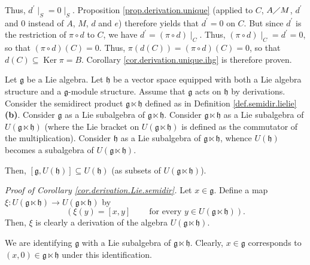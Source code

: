 \documentclass[etingof-lie.tex]{subfiles}
\begin{document}
Thus, $d^{\prime}\mid_{S}=0\mid_{S}$. Proposition \ref{prop.derivation.unique}
(applied to $C$, $A\diagup M$, $d^{\prime}$ and $0$ instead of $A$, $M$, $d$
and $e$) therefore yields that $d^{\prime}=0$ on $C$. But since $d^{\prime}$
is the restriction of $\pi\circ d$ to $C$, we have $d^{\prime}=\left(
\pi\circ d\right)  \mid_{C}$. Thus, $\left(  \pi\circ d\right)  \mid
_{C}=d^{\prime}=0$, so that $\left(  \pi\circ d\right)  \left(  C\right)  =0$.
Thus, $\pi\left(  d\left(  C\right)  \right)  =\left(  \pi\circ d\right)
\left(  C\right)  =0$, so that $d\left(  C\right)  \subseteq
\operatorname*{Ker}\pi=B$. Corollary \ref{cor.derivation.unique.ihg} is
therefore proven.

\begin{corollary}
\label{cor.derivation.Lie.semidir}Let $\mathfrak{g}$ be a Lie algebra. Let
$\mathfrak{h}$ be a vector space equipped with both a Lie algebra structure
and a $\mathfrak{g}$-module structure. Assume that $\mathfrak{g}$ acts on
$\mathfrak{h}$ by derivations. Consider the semidirect product $\mathfrak{g}%
\ltimes\mathfrak{h}$ defined as in Definition \ref{def.semidir.lielie}
\textbf{(b)}. Consider $\mathfrak{g}$ as a Lie subalgebra of $\mathfrak{g}%
\ltimes\mathfrak{h}$. Consider $\mathfrak{g}\ltimes\mathfrak{h}$ as a Lie
subalgebra of $U\left(  \mathfrak{g}\ltimes\mathfrak{h}\right)  $ (where the
Lie bracket on $U\left(  \mathfrak{g}\ltimes\mathfrak{h}\right)  $ is defined
as the commutator of the multiplication). Consider $\mathfrak{h}$ as a Lie
subalgebra of $\mathfrak{g}\ltimes\mathfrak{h}$, whence $U\left(
\mathfrak{h}\right)  $ becomes a subalgebra of $U\left(  \mathfrak{g}%
\ltimes\mathfrak{h}\right)  $.

Then, $\left[  \mathfrak{g},U\left(  \mathfrak{h}\right)  \right]  \subseteq
U\left(  \mathfrak{h}\right)  $ (as subsets of $U\left(  \mathfrak{g}%
\ltimes\mathfrak{h}\right)  $).
\end{corollary}

\textit{Proof of Corollary \ref{cor.derivation.Lie.semidir}.} Let
$x\in\mathfrak{g}$. Define a map $\xi:U\left(  \mathfrak{g}\ltimes
\mathfrak{h}\right)  \rightarrow U\left(  \mathfrak{g}\ltimes\mathfrak{h}%
\right)  $ by%
\[
\left(  \xi\left(  y\right)  =\left[  x,y\right]
\ \ \ \ \ \ \ \ \ \ \text{for every }y\in U\left(  \mathfrak{g}\ltimes
\mathfrak{h}\right)  \right)  .
\]
Then, $\xi$ is clearly a derivation of the algebra $U\left(  \mathfrak{g}%
\ltimes\mathfrak{h}\right)  $.

We are identifying $\mathfrak{g}$ with a Lie subalgebra of $\mathfrak{g}%
\ltimes\mathfrak{h}$. Clearly, $x\in\mathfrak{g}$ corresponds to $\left(
x,0\right)  \in\mathfrak{g}\ltimes\mathfrak{h}$ under this identification.
\end{document}
